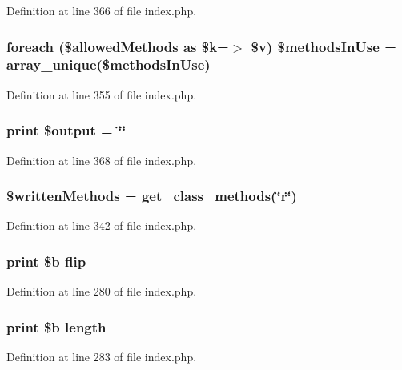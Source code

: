 Definition at line 366 of file index.\-php.

\hypertarget{index_8php_a1c475c0c53206fb15c4c3028bb7d5c7c}{
\subsubsection[{\$methods\-In\-Use}]{\setlength{\rightskip}{0pt plus 5cm}foreach (\$allowed\-Methods as \$k=$>$ \$v) \$methods\-In\-Use = array\-\_\-unique(\$methods\-In\-Use)}}\label{index_8php_a1c475c0c53206fb15c4c3028bb7d5c7c}


Definition at line 355 of file index.\-php.

\hypertarget{index_8php_a3b3e916294d02621688f0b1b64f95628}{
\subsubsection[{\$output}]{\setlength{\rightskip}{0pt plus 5cm}print \$output = \char`\"{}\char`\"{}}}\label{index_8php_a3b3e916294d02621688f0b1b64f95628}


Definition at line 368 of file index.\-php.

\hypertarget{index_8php_a2e64f0494f7eccf90168af7f67198650}{
\subsubsection[{\$written\-Methods}]{\setlength{\rightskip}{0pt plus 5cm}\$written\-Methods = get\-\_\-class\-\_\-methods(\char`\"{}r\char`\"{})}}\label{index_8php_a2e64f0494f7eccf90168af7f67198650}


Definition at line 342 of file index.\-php.

\hypertarget{index_8php_a976e7b3d05fce3934ce5bc7a635bcade}{
\subsubsection[{flip}]{\setlength{\rightskip}{0pt plus 5cm}print \$b {\bf flip}}}\label{index_8php_a976e7b3d05fce3934ce5bc7a635bcade}


Definition at line 280 of file index.\-php.

\hypertarget{index_8php_a328bd7d697cc1b3dfd1859d35420f2d0}{
\subsubsection[{length}]{\setlength{\rightskip}{0pt plus 5cm}print \$b {\bf length}}}\label{index_8php_a328bd7d697cc1b3dfd1859d35420f2d0}


Definition at line 283 of file index.\-php.

